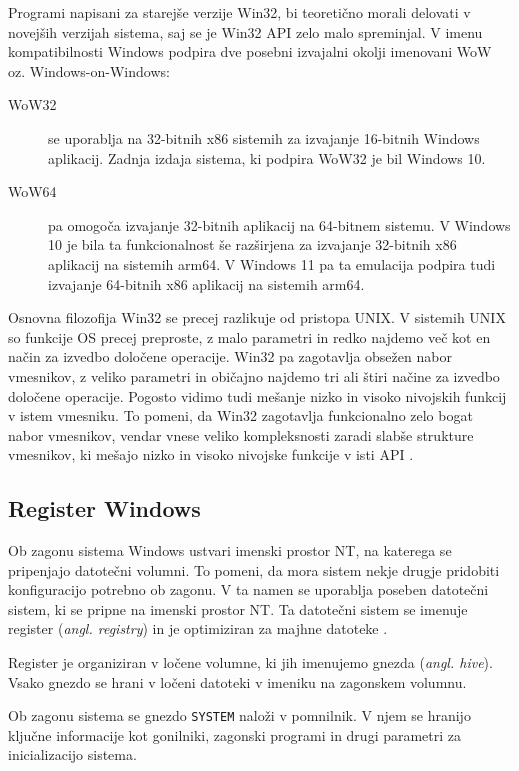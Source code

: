 \documentclass[a4paper,12pt,openright]{book}
\begin{document}
Programi napisani za starejše verzije Win32, bi teoretično morali delovati v novejših verzijah sistema, saj se je Win32 API zelo malo spreminjal.
V imenu kompatibilnosti Windows podpira dve posebni izvajalni okolji imenovani WoW oz. Windows-on-Windows:
\begin{description}
	\item[WoW32] se uporablja na 32-bitnih x86 sistemih za izvajanje 16-bitnih Windows aplikacij. Zadnja izdaja sistema, ki podpira WoW32 je bil Windows 10.
	\item[WoW64] pa omogoča izvajanje 32-bitnih aplikacij na 64-bitnem sistemu.
	V Windows 10 je bila ta funkcionalnost še razširjena za izvajanje 32-bitnih x86 aplikacij na sistemih arm64.
	V Windows 11 pa ta emulacija podpira tudi izvajanje 64-bitnih x86 aplikacij na sistemih arm64.
\end{description}

Osnovna filozofija Win32 se precej razlikuje od pristopa UNIX.
V sistemih UNIX so funkcije OS precej preproste, z malo parametri in redko najdemo več kot en način za izvedbo določene operacije.
Win32 pa zagotavlja obsežen nabor vmesnikov, z veliko parametri in običajno najdemo tri ali štiri načine za izvedbo določene operacije.
Pogosto vidimo tudi mešanje nizko in visoko nivojskih funkcij v istem vmesniku.
To pomeni, da Win32 zagotavlja funkcionalno zelo bogat nabor vmesnikov, vendar vnese veliko kompleksnosti zaradi slabše strukture vmesnikov, ki mešajo nizko in visoko nivojske funkcije v isti API \cite{Tanenbaum_Bos_2023}.

\subsection{Register Windows}

Ob zagonu sistema Windows ustvari imenski prostor NT, na katerega se pripenjajo datotečni volumni.
To pomeni, da mora sistem nekje drugje pridobiti konfiguracijo potrebno ob zagonu.
V ta namen se uporablja poseben datotečni sistem, ki se pripne na imenski prostor NT.
Ta datotečni sistem se imenuje register (\textit{angl. registry}) in je optimiziran za majhne datoteke \cite{Tanenbaum_Bos_2023}.

Register je organiziran v ločene volumne, ki jih imenujemo gnezda (\textit{angl. hive}).
Vsako gnezdo se hrani v ločeni datoteki v imeniku  na zagonskem volumnu.

Ob zagonu sistema se gnezdo \texttt{SYSTEM} naloži v pomnilnik.
V njem se hranijo ključne informacije kot gonilniki, zagonski programi in drugi parametri za inicializacijo sistema.
\end{document}
